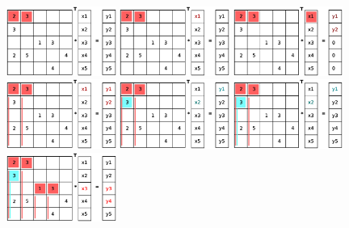 \documentclass[a4paper,11pt]{scrartcl}
\begin{document}
\begin{figure}[ht]\label{figure:coloring}
\includegraphics[width=0.32\textwidth]{graphic/coloringT2.eps}\hfill\vline\hfill
\includegraphics[width=0.32\textwidth]{graphic/coloringT3.eps}\hfill\vline\hfill
\includegraphics[width=0.32\textwidth]{graphic/coloringT4.eps}
\includegraphics[width=0.32\textwidth]{graphic/coloringT5.eps}\hfill\vline\hfill
\includegraphics[width=0.32\textwidth]{graphic/coloringT6.eps}\hfill\vline\hfill
\includegraphics[width=0.32\textwidth]{graphic/coloringT7.eps}
\includegraphics[width=0.32\textwidth]{graphic/coloringT8.eps}\hfill\vline\hfill

\end{figure}
\end{document}
